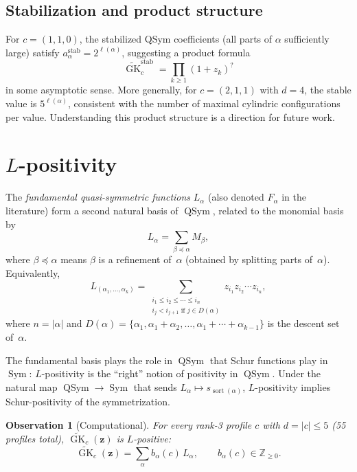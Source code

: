 \documentclass[11pt]{article}
\newtheorem{observation}[theorem]{Observation}
\newcommand{\Z}{\mathbb{Z}}
\newcommand{\GK}{\operatorname{GK}}
\newcommand{\QSym}{\operatorname{QSym}}
\newcommand{\Sym}{\operatorname{Sym}}
\begin{document}
\subsection{Stabilization and product structure}

For $c = (1,1,0)$, the stabilized QSym coefficients (all parts
of $\alpha$ sufficiently large) satisfy
$a_\alpha^{\mathrm{stab}} = 2^{\ell(\alpha)}$,
suggesting a product formula
\[
  \widetilde{\GK}_c^{\mathrm{stab}}
  = \prod_{k \geq 1} (1 + z_k)^?
\]
in some asymptotic sense. More generally, for $c = (2,1,1)$ with
$d=4$, the stable value is $5^{\ell(\alpha)}$, consistent with
the number of maximal cylindric configurations per value.
Understanding this product structure is a direction for future work.

\section{$L$-positivity}
\label{sec:L-positivity}

The \emph{fundamental quasi-symmetric functions} $L_\alpha$
(also denoted $F_\alpha$ in the literature) form a second
natural basis of $\QSym$, related to the monomial basis by
\[
  L_\alpha = \sum_{\beta \preceq \alpha} M_\beta,
\]
where $\beta \preceq \alpha$ means $\beta$ is a refinement
of~$\alpha$ (obtained by splitting parts of~$\alpha$).
Equivalently,
\[
  L_{(\alpha_1, \ldots, \alpha_k)}
  = \sum_{\substack{i_1 \leq i_2 \leq \cdots \leq i_n \\
    i_j < i_{j+1} \text{ if } j \in D(\alpha)}}
  z_{i_1} z_{i_2} \cdots z_{i_n},
\]
where $n = |\alpha|$ and $D(\alpha) = \{\alpha_1, \alpha_1+\alpha_2,
\ldots, \alpha_1+\cdots+\alpha_{k-1}\}$ is the descent set of~$\alpha$.

The fundamental basis plays the role in $\QSym$ that Schur functions
play in $\Sym$: $L$-positivity is the ``right'' notion of positivity
in $\QSym$. Under the natural map $\QSym \to \Sym$ that sends
$L_\alpha \mapsto s_{\operatorname{sort}(\alpha)}$,
$L$-positivity implies Schur-positivity of the symmetrization.

\begin{observation}[Computational]\label{obs:L-pos}
For every rank-3 profile $c$ with $d = |c| \leq 5$ (55 profiles total),
$\widetilde{\GK}_c(\mathbf{z})$ is $L$-positive:
\begin{equation}\label{eq:L-expansion}
  \widetilde{\GK}_c(\mathbf{z})
  = \sum_{\alpha} b_\alpha(c)\, L_\alpha,
  \qquad b_\alpha(c) \in \Z_{\geq 0}.
\end{equation}
\end{observation}
\end{document}
